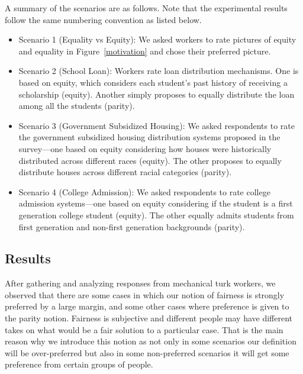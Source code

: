 A summary of the scenarios are as follows. Note that the experimental results follow the same numbering convention as listed below.
\begin{itemize}
    \item Scenario 1 (Equality vs Equity): We asked workers to rate pictures of equity and equality in Figure~\ref{motivation} and chose their preferred picture.
    \item Scenario 2 (School Loan): Workers rate loan distribution mechanisms. One is based on equity, which considers each student's past history of receiving a scholarship (equity). Another simply proposes to equally distribute the loan among all the students (parity).
    \item Scenario 3 (Government Subsidized Housing):  We asked respondents to rate the government subsidized housing distribution systems proposed in the survey---one based on equity considering how houses were historically distributed across different races (equity). The other proposes to equally distribute houses across different racial categories (parity).
    \item Scenario 4 (College Admission): We asked respondents to rate college admission systems---one based on equity considering if the student is a first generation college student (equity). The other equally admits students from first generation and non-first generation backgrounds (parity).
\end{itemize}
\subsection{Results}
After gathering and analyzing responses from mechanical turk workers, we observed that there are some cases in which our notion of fairness is strongly preferred by a large margin, and some other cases where preference is given to the parity notion. Fairness is subjective and different people may have different takes on what would be a fair solution to a particular case. That is the main reason why we introduce this notion as not only in some scenarios our definition will be over-preferred but also in some non-preferred scenarios it will get some preference from certain groups of people.

